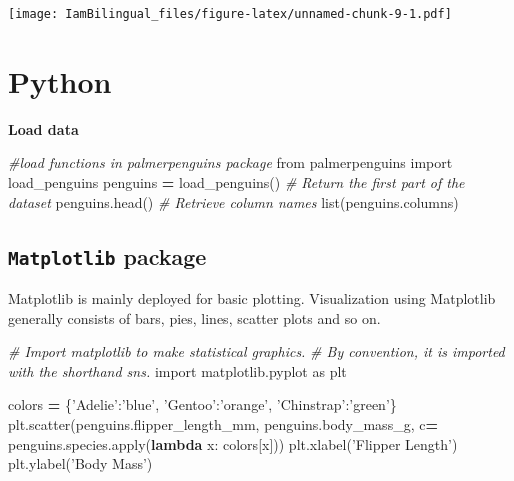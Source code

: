 \documentclass[]{book}
\newenvironment{Shaded}{\begin{snugshade}}{\end{snugshade}}
\newcommand{\BuiltInTok}[1]{#1}
\newcommand{\CommentTok}[1]{\textcolor[rgb]{0.56,0.35,0.01}{\textit{#1}}}
\newcommand{\ImportTok}[1]{#1}
\newcommand{\KeywordTok}[1]{\textcolor[rgb]{0.13,0.29,0.53}{\textbf{#1}}}
\newcommand{\NormalTok}[1]{#1}
\newcommand{\OperatorTok}[1]{\textcolor[rgb]{0.81,0.36,0.00}{\textbf{#1}}}
\newcommand{\StringTok}[1]{\textcolor[rgb]{0.31,0.60,0.02}{#1}}
\begin{document}
\texttt{[image: IamBilingual\_files/figure-latex/unnamed-chunk-9-1.pdf]}

\hypertarget{python-4}{%
\section{Python}\label{python-4}}

\textbf{Load data}

\begin{Shaded}
\begin{Highlighting}[]
\CommentTok{#load functions in palmerpenguins package}
\ImportTok{from}\NormalTok{ palmerpenguins }\ImportTok{import}\NormalTok{ load_penguins}
\NormalTok{penguins }\OperatorTok{=}\NormalTok{ load_penguins()}
\CommentTok{# Return the first part of the dataset}
\NormalTok{penguins.head()}
\CommentTok{# Retrieve column names}
\BuiltInTok{list}\NormalTok{(penguins.columns)}
\end{Highlighting}
\end{Shaded}

\hypertarget{matplotlib-package}{%
\subsection{\texorpdfstring{\texttt{Matplotlib} package}{Matplotlib package}}\label{matplotlib-package}}

Matplotlib is mainly deployed for basic plotting. Visualization using Matplotlib generally consists of bars, pies, lines, scatter plots and so on.

\begin{Shaded}
\begin{Highlighting}[]
\CommentTok{# Import matplotlib to make statistical graphics. }
\CommentTok{# By convention, it is imported with the shorthand sns.}
\ImportTok{import}\NormalTok{ matplotlib.pyplot }\ImportTok{as}\NormalTok{ plt}

\NormalTok{colors }\OperatorTok{=}\NormalTok{ \{}\StringTok{'Adelie'}\NormalTok{:}\StringTok{'blue'}\NormalTok{, }\StringTok{'Gentoo'}\NormalTok{:}\StringTok{'orange'}\NormalTok{, }\StringTok{'Chinstrap'}\NormalTok{:}\StringTok{'green'}\NormalTok{\}}
\NormalTok{plt.scatter(penguins.flipper_length_mm,}
\NormalTok{penguins.body_mass_g, }
\NormalTok{c}\OperatorTok{=}\NormalTok{ penguins.species.}\BuiltInTok{apply}\NormalTok{(}\KeywordTok{lambda}\NormalTok{ x: colors[x]))}
\NormalTok{plt.xlabel(}\StringTok{'Flipper Length'}\NormalTok{)}
\NormalTok{plt.ylabel(}\StringTok{'Body Mass'}\NormalTok{)}
\end{Highlighting}
\end{Shaded}
\end{document}
